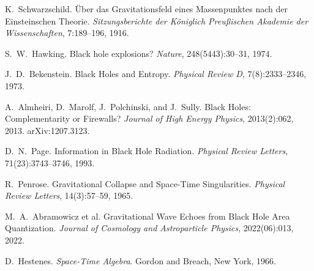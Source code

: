 \documentclass[11pt,a4paper]{article}
\numberwithin{equation}{section}
\theoremstyle{plain}
\theoremstyle{definition}
\theoremstyle{remark}
\begin{document}
\begin{thebibliography}{99}

K.~Schwarzschild.
\newblock Über das Gravitationsfeld eines Massenpunktes nach der Einsteinschen Theorie.
\newblock \emph{Sitzungsberichte der Königlich Preußischen Akademie der Wissenschaften}, 7:189--196, 1916.

S.~W.~Hawking.
\newblock Black hole explosions?
\newblock \emph{Nature}, 248(5443):30--31, 1974.

J.~D.~Bekenstein.
\newblock Black Holes and Entropy.
\newblock \emph{Physical Review D}, 7(8):2333--2346, 1973.

A.~Almheiri, D.~Marolf, J.~Polchinski, and J.~Sully.
\newblock Black Holes: Complementarity or Firewalls?
\newblock \emph{Journal of High Energy Physics}, 2013(2):062, 2013. arXiv:1207.3123.

D.~N.~Page.
\newblock Information in Black Hole Radiation.
\newblock \emph{Physical Review Letters}, 71(23):3743--3746, 1993.

R.~Penrose.
\newblock Gravitational Collapse and Space-Time Singularities.
\newblock \emph{Physical Review Letters}, 14(3):57--59, 1965.

M.~A.~Abramowicz et al.
\newblock Gravitational Wave Echoes from Black Hole Area Quantization.
\newblock \emph{Journal of Cosmology and Astroparticle Physics}, 2022(06):013, 2022.

D.~Hestenes.
\newblock \emph{Space-Time Algebra}.
\newblock Gordon and Breach, New York, 1966.

\end{thebibliography}

\end{document}
